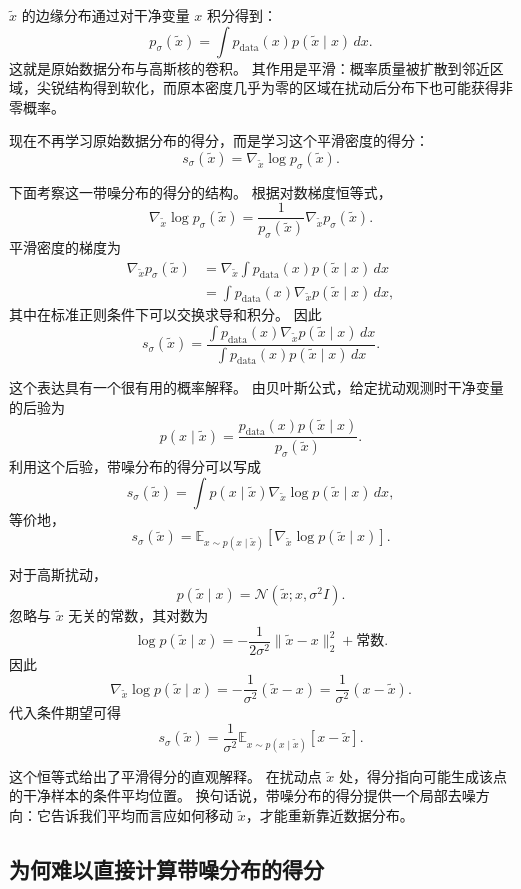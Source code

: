 $\tilde{x}$ 的边缘分布通过对干净变量 $x$ 积分得到：
\[
p_\sigma(\tilde{x})
=
\int
p_{\text{data}}(x)
p(\tilde{x}\mid x)
\,dx.
\]
这就是原始数据分布与高斯核的卷积。
其作用是平滑：概率质量被扩散到邻近区域，尖锐结构得到软化，而原本密度几乎为零的区域在扰动后分布下也可能获得非零概率。

现在不再学习原始数据分布的得分，而是学习这个平滑密度的得分：
\[
s_\sigma(\tilde{x})
=
\nabla_{\tilde{x}}\log p_\sigma(\tilde{x}).
\]

下面考察这一带噪分布的得分的结构。
根据对数梯度恒等式，
\[
\nabla_{\tilde{x}}\log p_\sigma(\tilde{x})
=
\frac{1}{p_\sigma(\tilde{x})}
\nabla_{\tilde{x}}p_\sigma(\tilde{x}).
\]
平滑密度的梯度为
\[
\begin{aligned}
\nabla_{\tilde{x}}p_\sigma(\tilde{x})
&=
\nabla_{\tilde{x}}
\int
p_{\text{data}}(x)
p(\tilde{x}\mid x)
\,dx \\[4pt]
&=
\int
p_{\text{data}}(x)
\nabla_{\tilde{x}}p(\tilde{x}\mid x)
\,dx,
\end{aligned}
\]
其中在标准正则条件下可以交换求导和积分。
因此
\[
s_\sigma(\tilde{x})
=
\frac{
\int
p_{\text{data}}(x)
\nabla_{\tilde{x}}p(\tilde{x}\mid x)
\,dx
}{
\int
p_{\text{data}}(x)
p(\tilde{x}\mid x)
\,dx
}.
\]

这个表达具有一个很有用的概率解释。
由贝叶斯公式，给定扰动观测时干净变量的后验为
\[
p(x\mid\tilde{x})
=
\frac{
p_{\text{data}}(x)p(\tilde{x}\mid x)
}{
p_\sigma(\tilde{x})
}.
\]
利用这个后验，带噪分布的得分可以写成
\[
s_\sigma(\tilde{x})
=
\int
p(x\mid\tilde{x})
\nabla_{\tilde{x}}\log p(\tilde{x}\mid x)
\,dx,
\]
等价地，
\[
s_\sigma(\tilde{x})
=
\mathbb{E}_{x\sim p(x\mid\tilde{x})}
\left[
\nabla_{\tilde{x}}\log p(\tilde{x}\mid x)
\right].
\]

对于高斯扰动，
\[
p(\tilde{x}\mid x)
=
\mathcal{N}(\tilde{x};x,\sigma^2 I).
\]
忽略与 $\tilde{x}$ 无关的常数，其对数为
\[
\log p(\tilde{x}\mid x)
=
-\frac{1}{2\sigma^2}
\|\tilde{x}-x\|_2^2
+\text{常数}.
\]
因此
\[
\nabla_{\tilde{x}}\log p(\tilde{x}\mid x)
=
-\frac{1}{\sigma^2}(\tilde{x}-x)
=
\frac{1}{\sigma^2}(x-\tilde{x}).
\]
代入条件期望可得
\[
\boxed{
s_\sigma(\tilde{x})
=
\frac{1}{\sigma^2}
\mathbb{E}_{x\sim p(x\mid\tilde{x})}
\left[
x-\tilde{x}
\right].
}
\]

这个恒等式给出了平滑得分的直观解释。
在扰动点 $\tilde{x}$ 处，得分指向可能生成该点的干净样本的条件平均位置。
换句话说，带噪分布的得分提供一个局部去噪方向：它告诉我们平均而言应如何移动 $\tilde{x}$，才能重新靠近数据分布。

\subsection{为何难以直接计算带噪分布的得分}

